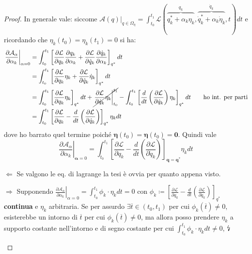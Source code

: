 \documentclass[a4paper,10pt]{article}
\theoremstyle{definition}
\newcommand{\bv}{\boldsymbol} %
\theoremstyle{indentdefinition}
\theoremstyle{indenttheorem}
\theoremstyle{myremark}
\theoremstyle{indentgeneral}
\newenvironment{lyxlist}[1]
	{\begin{list}{}
		{\settowidth{\labelwidth}{#1}
		 \setlength{\leftmargin}{\labelwidth}
		 \addtolength{\leftmargin}{\labelsep}
		 \renewcommand{\makelabel}[1]{##1\hfil}}}
	{\end{list}}
\begin{document}
\begin{proof}In generale vale: siccome $\left.\mathcal{A}\left(q\right)\right|_{q\in\Omega_{\eta}}=\int_{t_{0}}^{t_{1}}\mathcal{L}(\overbrace{q_{k}^{*}+\alpha_{k}\eta_{k}}^{q_k},\overbrace{\dot{q}_{k}^{*}+\alpha_{k}\dot{\eta}_{k}}^{\dot{q}_k},t)dt$
e ricordando che $\eta_{k}\left(t_{0}\right)=\eta_{k}\left(t_{1}\right)=0$ si ha:
\begin{align*}
\left.\frac{\partial\mathcal{A}_{\alpha}}{\partial\alpha_{k}}\right|_{\alpha=0} 
&=\int_{t_{0}}^{t_{1}}\left[\frac{\partial\mathcal{L}}{\partial q_{k}}\frac{\partial q_k}{\partial \alpha_k}+\frac{\partial\mathcal{L}}{\partial\dot{q}_{k}}\frac{\partial \dot{q}_k}{\partial \alpha_k}\right]_{q^{*}}dt \\
&=\int_{t_{0}}^{t_{1}}\left[\frac{\partial\mathcal{L}}{\partial q_{k}}\eta_{k}+\frac{\partial\mathcal{L}}{\partial\dot{q}_{k}}\dot{\eta}_{k}\right]_{q^{*}}dt \\
&=\int_{t_{0}}^{t_{1}}\left[\frac{\partial\mathcal{L}}{\partial q_{k}}\eta_{k}\right]_{q^{*}}dt+\cancel{\left.\frac{\partial\mathcal{L}}{\partial\dot{q}_{k}}\eta_{k}\right|_{t_{0}}^{t_{1}}}-\int_{t_{0}}^{t_{1}}\left[\frac{d}{dt}\left(\frac{\partial\mathcal{L}}{\partial\dot{q}_{k}}\right)\eta_{k}\right]_{q^{*}}dt \qquad\text{ho int. per parti}\\
 &=\int_{t_{0}}^{t_{1}}\left[\frac{\partial\mathcal{L}}{\partial q_{k}}-\frac{d}{dt}\left(\frac{\partial\mathcal{L}}{\partial\dot{q}_{k}}\right)\right]_{q^{*}}\eta_{k}dt
\end{align*}
dove ho barrato quel termine poiché $\bv{\eta}(t_0)=\bv{\eta}(t_0)=\bv{0}$. Quindi vale
$$\boxed{\left.\frac{\partial\mathcal{A}_{\alpha}}{\partial\alpha_{k}}\right|_{\bv{\alpha}=0}=\int_{t_{0}}^{t_{1}}\left[\frac{\partial\mathcal{L}}{\partial q_{k}}-\frac{d}{dt}\left(\frac{\partial\mathcal{L}}{\partial\dot{q}_{k}}\right)\right]_{\bv{q}=\bv{q}^{*}}\eta_{k}dt }$$ 
\begin{lyxlist}{00.00.0000}
\item [{$\Longleftarrow$}] Se valgono le eq. di lagrange la tesi è ovvia per quanto appena visto.
\item [{$\Longrightarrow$}] Supponendo $\left.\frac{\partial\mathcal{A}_{\alpha}}{\partial\alpha_{k}}\right|_{\alpha=0}=\int_{t_{0}}^{t_{1}}\phi_{k}\cdot\eta_{k}dt=0$
con $\phi_{k}\coloneqq\left[\frac{\partial\mathcal{L}}{\partial q_{k}}-\frac{d}{dt}\left(\frac{\partial\mathcal{L}}{\partial\dot{q}_{k}}\right)\right]_{q^{*}}$
\textbf{continua} e $\eta_{k}$ arbitraria. Se per assurdo $\exists\overline{t}\in\left(t_{0},t_{1}\right)$
per cui $\phi_{k}\left(\overline{t}\right)\neq0$, esisterebbe un
intorno di $\overline{t}$ per cui $\phi_{k}\left(\overline{t}\right)\neq0$,
ma allora posso prendere $\eta_{k}$ a supporto costante nell'intorno
e di segno costante per cui $\int_{t_{0}}^{t_{1}}\phi_{k}\cdot\eta_{k}dt\neq0$,
$\text{\lightning}$
\end{lyxlist}
\end{proof}
\end{document}

